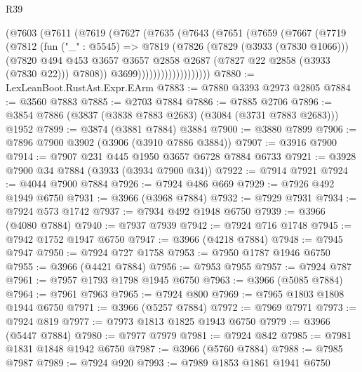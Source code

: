 \begin{lexlean}{R39}
\begin{coremodule}
                  (@7603
                    (@7611
                      (@7619
                        (@7627
                          (@7635
                            (@7643
                              (@7651
                                (@7659
                                  (@7667
                                    (@7719
                                      (@7812
                                        (fun ("_" : @5545) =>
                                        @7819
                                          (@7826
                                            (@7829 (@3933 (@7830 @1066)))
                                            (@7820
                                              @494
                                              @453
                                              @3657
                                              @3657
                                              @2858
                                              @2687
                                              (@7827 @22 @2858 (@3933 (@7830 @22)))
                                              @7808))
                                          @3699)))))))))))))))))))
@7880 := LexLeanBoot.RustAst.Expr.EArm
@7883 := @7880 @3393 @2973 @2805
@7884 := @3560 @7883
@7885 := @2703 @7884
@7886 := @7885 @2706
@7896 := @3854 @7886 (@3837 (@3838 @7883 @2683) (@3084 (@3731 @7883 @2683))) @1952
@7899 := @3874 (@3881 @7884) @3884
@7900 := @3880 @7899
@7906 := @7896 @7900 @3902 (@3906 (@3910 @7886 @3884))
@7907 := @3916 @7900
@7914 := @7907 @231 @445 @1950 @3657 @6728 @7884 @6733
@7921 := @3928 @7900 @34 @7884 (@3933 (@3934 @7900 @34))
@7922 := @7914 @7921
@7924 := @4044 @7900 @7884
@7926 := @7924 @486 @669
@7929 := @7926 @492 @1949 @6750
@7931 := @3966 (@3968 @7884)
@7932 := @7929 @7931
@7934 := @7924 @573 @1742
@7937 := @7934 @492 @1948 @6750
@7939 := @3966 (@4080 @7884)
@7940 := @7937 @7939
@7942 := @7924 @716 @1748
@7945 := @7942 @1752 @1947 @6750
@7947 := @3966 (@4218 @7884)
@7948 := @7945 @7947
@7950 := @7924 @727 @1758
@7953 := @7950 @1787 @1946 @6750
@7955 := @3966 (@4421 @7884)
@7956 := @7953 @7955
@7957 := @7924 @787
@7961 := @7957 @1793 @1798 @1945 @6750
@7963 := @3966 (@5085 @7884)
@7964 := @7961 @7963
@7965 := @7924 @800
@7969 := @7965 @1803 @1808 @1944 @6750
@7971 := @3966 (@5257 @7884)
@7972 := @7969 @7971
@7973 := @7924 @819
@7977 := @7973 @1813 @1825 @1943 @6750
@7979 := @3966 (@5447 @7884)
@7980 := @7977 @7979
@7981 := @7924 @842
@7985 := @7981 @1831 @1848 @1942 @6750
@7987 := @3966 (@5760 @7884)
@7988 := @7985 @7987
@7989 := @7924 @920
@7993 := @7989 @1853 @1861 @1941 @6750

\end{coremodule}
\end{lexlean}
